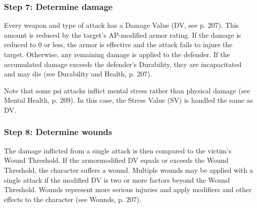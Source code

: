 \subsubsection{Step 7: Determine damage}

Every weapon and type of attack has a Damage Value (DV, see p. 207). This amount is reduced by the target’s AP-modified armor rating. If the damage is reduced to 0 or less, the armor is effective and the attack fails to injure the target. Otherwise, any remaining damage is applied to the defender. If the accumulated damage exceeds the defender’s Durability, they are incapacitated and may die (see Durability and Health, p. 207).

Note that some psi attacks inflict mental stress rather than physical damage (see Mental Health, p. 209). In this case, the Stress Value (SV) is handled the same as DV.

\subsubsection{Step 8: Determine wounds}

The damage inflicted from a single attack is then compared to the victim’s Wound Threshold. If the armormodified DV equals or exceeds the Wound Threshold, the character suffers a wound. Multiple wounds may be applied with a single attack if the modified DV is two or more factors beyond the Wound Threshold. Wounds represent more serious injuries and apply modifiers and other effects to the character (see Wounds, p. 207).

